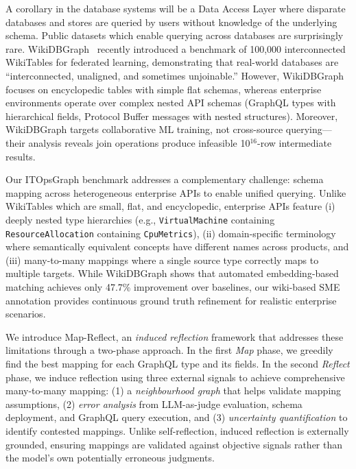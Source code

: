 \documentclass[sigconf, nonacm]{acmart}
\newcommand{\deleted}[1]{\textcolor{red}{#1}}
\begin{document}
A corollary in the database systems will be a Data Access Layer where disparate databases and stores are queried by users without knowledge of the underlying schema. Public datasets which enable querying across databases are surprisingly rare. WikiDBGraph~\cite{wu2025wikidbgraph} recently introduced a benchmark of 100,000 interconnected WikiTables for federated learning, demonstrating that real-world databases are ``interconnected, unaligned, and sometimes unjoinable.'' However, WikiDBGraph focuses on encyclopedic tables with simple flat schemas, whereas enterprise environments operate over complex nested API schemas (GraphQL types with hierarchical fields, Protocol Buffer messages with nested structures). Moreover, WikiDBGraph targets collaborative ML training, not cross-source querying—their analysis reveals join operations produce infeasible 10$^{16}$-row intermediate results.

Our ITOpsGraph benchmark addresses a complementary challenge: schema mapping across heterogeneous enterprise APIs to enable unified querying. Unlike WikiTables which are small, flat, and encyclopedic, enterprise APIs feature (i) deeply nested type hierarchies (e.g., \texttt{VirtualMachine} containing \texttt{ResourceAllocation} containing \texttt{CpuMetrics}), (ii) domain-specific terminology where semantically equivalent concepts have different names across products, and (iii) many-to-many mappings where a single source type correctly maps to multiple targets. While WikiDBGraph shows that automated embedding-based matching achieves only 47.7\% improvement over baselines, our wiki-based SME annotation provides continuous ground truth refinement for realistic enterprise scenarios. 


We introduce Map-Reflect, an \emph{induced reflection} framework that addresses these limitations through a two-phase approach. In the first \emph{Map} phase, we greedily find the best mapping for each GraphQL type and its fields. In the second \emph{Reflect} phase, we induce reflection using three external signals to achieve comprehensive many-to-many mapping: (1) a \emph{neighbourhood graph} that helps validate mapping assumptions, (2) \emph{error analysis} from LLM-as-judge evaluation, schema deployment, and GraphQL query execution, and (3) \emph{uncertainty quantification} to identify contested mappings. Unlike self-reflection, induced reflection is externally grounded, ensuring mappings are validated against objective signals rather than the model's own potentially erroneous judgments.
\end{document}
